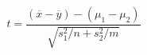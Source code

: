 \begin{equation}
\label{eq:ttest}
t=\frac{(\overline{x}−\overline{y})−(\mu_1−\mu_2)}{\sqrt{s_1^2/n+s_2^2/m}}
\end{equation}